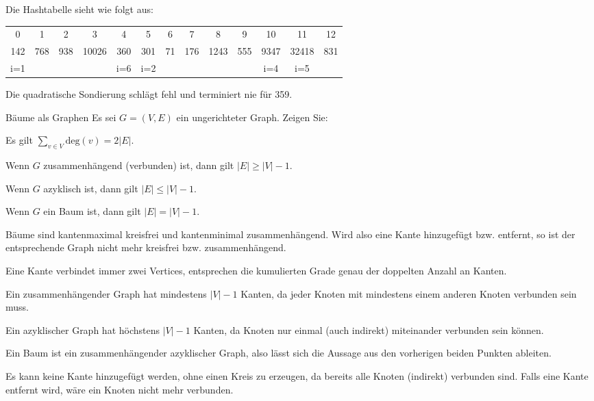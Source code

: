 \documentclass{exercisesheet}
\begin{document}
\begin{solutions}
  \item Die Hashtabelle sieht wie folgt aus:
  \begin{table*}[ht]
    \centering
    \begin{tabular}{|c|c|c|c|c| c|c|c|c|c| c|c|c|}
      0   & 1   & 2   & 3     & 4   & 5   & 6  & 7   & 8    & 9   & 10   & 11    & 12  \\
      142 & 768 & 938 & 10026 & 360 & 301 & 71 & 176 & 1243 & 555 & 9347 & 32418 & 831 \\
      i=1 &     &     &       & i=6 & i=2 &    &     &      &     & i=4  & i=5   &     \\
    \end{tabular}
  \end{table*}
  \item Die quadratische Sondierung schlägt fehl und terminiert nie für 359.
\end{solutions}

\begin{eexercises}{Bäume als Graphen}{
    Es sei $G = (V, E)$ ein ungerichteter Graph. Zeigen Sie:
  }
  \item Es gilt $\sum_{v \in V} \text{deg}(v) = 2|E|$.
  \item Wenn $G$ zusammenhängend (verbunden) ist, dann gilt $|E| \geq |V| - 1$.
  \item Wenn $G$ azyklisch ist, dann gilt $|E| \leq |V| - 1$.
  \item Wenn $G$ ein Baum ist, dann gilt $|E| = |V| - 1$.
  \item Bäume sind kantenmaximal kreisfrei und kantenminimal zusammenhängend. Wird also eine Kante hinzugefügt bzw. entfernt, so ist der entsprechende Graph nicht mehr kreisfrei bzw. zusammenhängend.
\end{eexercises}

\begin{solutions}
  \item Eine Kante verbindet immer zwei Vertices, entsprechen die kumulierten Grade genau der doppelten Anzahl an Kanten.
  \item Ein zusammenhängender Graph hat mindestens $|V| - 1$ Kanten, da jeder Knoten mit mindestens einem anderen Knoten verbunden sein muss.
  \item Ein azyklischer Graph hat höchstens $|V| - 1$ Kanten, da Knoten nur einmal (auch indirekt) miteinander verbunden sein können.
  \item Ein Baum ist ein zusammenhängender azyklischer Graph, also lässt sich die Aussage aus den vorherigen beiden Punkten ableiten.
  \item Es kann keine Kante hinzugefügt werden, ohne einen Kreis zu erzeugen, da bereits alle Knoten (indirekt) verbunden sind. Falls eine Kante entfernt wird, wäre ein Knoten nicht mehr verbunden.
\end{solutions}
\end{document}
